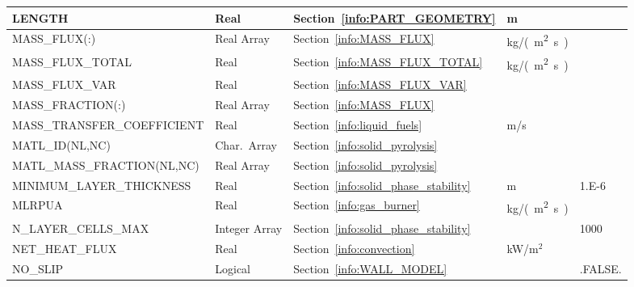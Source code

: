\documentclass[11pt]{book}
\begin{document}
\begin{longtable}{@{\extracolsep{\fill}}|l|l|l|l|l|}
{\ct LENGTH}                            & Real            & Section~\ref{info:PART_GEOMETRY}          & m                   &                         \\ \hline
{\ct MASS\_FLUX(:)}                     & Real Array      & Section~\ref{info:MASS_FLUX}              & \si{kg/(m^2.s)}     &                         \\ \hline
{\ct MASS\_FLUX\_TOTAL}                 & Real            & Section~\ref{info:MASS_FLUX_TOTAL}        & \si{kg/(m^2.s)}     &                         \\ \hline
{\ct MASS\_FLUX\_VAR}                   & Real            & Section~\ref{info:MASS_FLUX_VAR}          &                     &                         \\ \hline
{\ct MASS\_FRACTION(:)}                 & Real Array      & Section~\ref{info:MASS_FLUX}              &                     &                         \\ \hline
{\ct MASS\_TRANSFER\_COEFFICIENT}       & Real            & Section~\ref{info:liquid_fuels}           & m/s                 &                         \\ \hline
{\ct MATL\_ID(NL,NC)}                   & Char.~Array     & Section~\ref{info:solid_pyrolysis}        &                     &                         \\ \hline
{\ct MATL\_MASS\_FRACTION(NL,NC)}       & Real Array      & Section~\ref{info:solid_pyrolysis}        &                     &                         \\ \hline
{\ct MINIMUM\_LAYER\_THICKNESS}         & Real            & Section~\ref{info:solid_phase_stability}  & m                   & 1.E-6                   \\ \hline
{\ct MLRPUA }                           & Real            & Section~\ref{info:gas_burner}             & \si{kg/(m^2.s)}     &                         \\ \hline
{\ct N\_LAYER\_CELLS\_MAX}              & Integer Array   & Section~\ref{info:solid_phase_stability}  &                     & 1000                    \\ \hline
{\ct NET\_HEAT\_FLUX}                   & Real            & Section~\ref{info:convection}             & kW/m$^2$            &                         \\ \hline
{\ct NO\_SLIP}                          & Logical         & Section~\ref{info:WALL_MODEL}             &                     & {\ct .FALSE.}           \\ \hline

\end{longtable}
\end{document}
